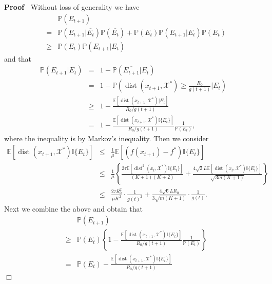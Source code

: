 \documentclass{article}
\newcommand{\cdummy}{\cdot}
\newcommand{\tmop}[1]{\ensuremath{\operatorname{#1}}}
\newenvironment{proof}{\noindent\textbf{Proof\ }}{\hspace*{\fill}$\Box$\medskip}
\begin{document}
\begin{proof}
  Without loss of generality we have
  \begin{eqnarray*}
    &  & \mathbb{P} (E_{t + 1})\\
    & = & \mathbb{P} (E_{t + 1} | \overline{E_t}) \mathbb{P} (\overline{E_t})
    +\mathbb{P} (E_t) \mathbb{P} (E_{t + 1} |E_t) \mathbb{P} (E_t)\\
    & \geq & \mathbb{P} (E_t) \mathbb{P} (E_{t + 1} |E_t)
  \end{eqnarray*}
  and that
  \begin{eqnarray*}
    \mathbb{P} (E_{t + 1} |E_t) & = & 1 -\mathbb{P} (\overline{E_{t + 1}}
    |E_t)\\
    & = & 1 -\mathbb{P} \left( \tmop{dist} (x_{t + 1}, \mathcal{X}^{\ast})
    \geq \frac{R_0}{g (t + 1)} |E_t \right)\\
    & \geq & 1 - \frac{\mathbb{E} [\tmop{dist} (x_{t + 1},
    \mathcal{X}^{\ast}) | E_t]}{R_0 / g (t + 1)}\\
    & = & 1 - \frac{\mathbb{E} [\tmop{dist} (x_{t + 1}, \mathcal{X}^{\ast})
    \mathbb{I} \{ E_t \}]}{R_0 / g (t + 1)} \frac{1}{\mathbb{P} (E_t)},
  \end{eqnarray*}
  where the inequality is by Markov's inequality. Then we consider
  \begin{eqnarray*}
    \mathbb{E} [\tmop{dist} (x_{t + 1}, \mathcal{X}^{\ast}) \mathbb{I} \{ E_t
    \}] & \leq & \frac{1}{\mu} \mathbb{E} [(f (x_{t + 1}) - f^{\ast})
    \mathbb{I} \{ E_t \}]\\
    & \leq & \frac{1}{\mu} \left\{ \frac{2 \tau \mathbb{E} [\tmop{dist}^2
    (x_t, \mathcal{X}^{\ast}) \mathbb{I} \{ E_t \}]}{(K + 1) (K + 2)} +
    \frac{4 \sqrt{2} L\mathbb{E} [\tmop{dist} (x_t, \mathcal{X}^{\ast})
    \mathbb{I} \{ E_t \}]}{\sqrt{3 m (K + 1)}} \right\}\\
    & \leq & \frac{2 \tau R_0^2}{\mu K^2} \cdummy \frac{1}{g (t)^2} + \frac{4
    \sqrt{6} L R_0}{3 \sqrt{m (K + 1)}} \cdummy \frac{1}{g (t)} .
  \end{eqnarray*}
  Next we combine the above and obtain that
  \begin{eqnarray*}
    &  & \mathbb{P} (E_{t + 1})\\
    & \geq & \mathbb{P} (E_t) \left\{ 1 - \frac{\mathbb{E} [\tmop{dist} (x_{t
    + 1}, \mathcal{X}^{\ast}) \mathbb{I} \{ E_t \}]}{R_0 / g (t + 1)}
    \frac{1}{\mathbb{P} (E_t)} \right\}\\
    & = & \mathbb{P} (E_t) - \frac{\mathbb{E} [\tmop{dist} (x_{t + 1},
    \mathcal{X}^{\ast}) \mathbb{I} \{ E_t \}]}{R_0 / g (t + 1)}\\

\end{eqnarray*}
\end{proof}
\end{document}
